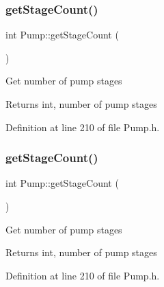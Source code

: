 \mbox{\label{class_pump_a2a8754f53b289dc41f3220adc4eb56e1}} 
\subsubsection{\texorpdfstring{get\+Stage\+Count()}{getStageCount()}\hspace{0.1cm}{\footnotesize\ttfamily [1/3]}}
{\footnotesize\ttfamily int Pump\+::get\+Stage\+Count (\begin{DoxyParamCaption}{ }\end{DoxyParamCaption})\hspace{0.3cm}{\ttfamily [inline]}}

Get number of pump stages

\begin{DoxyReturn}{Returns}
int, number of pump stages 
\end{DoxyReturn}


Definition at line 210 of file Pump.\+h.

\mbox{\label{class_pump_a2a8754f53b289dc41f3220adc4eb56e1}} 
\subsubsection{\texorpdfstring{get\+Stage\+Count()}{getStageCount()}\hspace{0.1cm}{\footnotesize\ttfamily [2/3]}}
{\footnotesize\ttfamily int Pump\+::get\+Stage\+Count (\begin{DoxyParamCaption}{ }\end{DoxyParamCaption})\hspace{0.3cm}{\ttfamily [inline]}}

Get number of pump stages

\begin{DoxyReturn}{Returns}
int, number of pump stages 
\end{DoxyReturn}


Definition at line 210 of file Pump.\+h.

\mbox{\label{class_pump_a2a8754f53b289dc41f3220adc4eb56e1}} 
